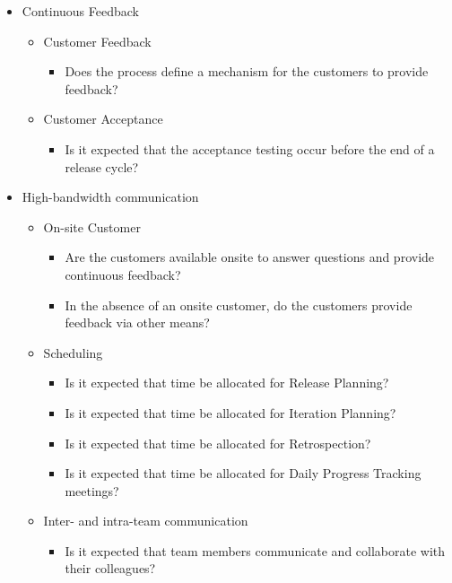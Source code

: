 \begin{itemize}
\begin{itemize}
\begin{itemize}
				\end{itemize}
		\end{itemize}
	\item Continuous Feedback
		\begin{itemize}
			\item Customer Feedback
				\begin{itemize}
					\item Does the process define a mechanism for the customers to provide feedback?
				\end{itemize}			
		\end{itemize}
		\begin{itemize}
			\item Customer Acceptance
				\begin{itemize}
					\item Is it expected that the acceptance testing occur before the end of a release cycle?
				\end{itemize}
		\end{itemize}
	\item High-bandwidth communication
		\begin{itemize}
			\item On-site Customer
				\begin{itemize}
					\item Are the customers available onsite to answer questions and provide continuous feedback? 
					\item In the absence of an onsite customer, do the customers provide feedback via other means? 
				\end{itemize}	
			\item Scheduling
				\begin{itemize}
					\item Is it expected that time be allocated for Release Planning?
					\item Is it expected that time be allocated for Iteration Planning?
					\item Is it expected that time be allocated for Retrospection? 
					\item Is it expected that time be allocated for Daily Progress Tracking meetings?
				\end{itemize}
			\item Inter- and intra-team communication
				\begin{itemize}
					\item Is it expected that team members communicate and collaborate with their colleagues?

\end{itemize}
\end{itemize}
\end{itemize}
